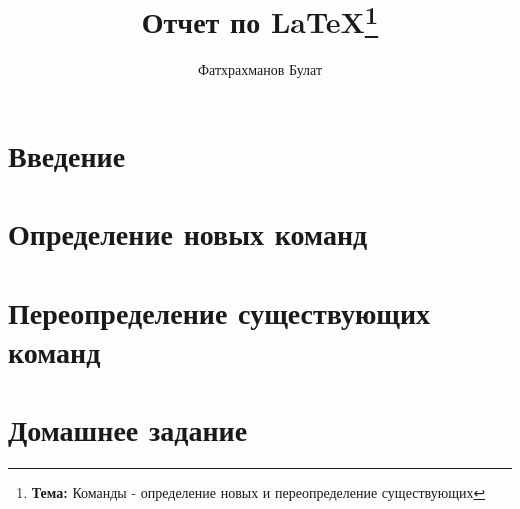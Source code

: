 \documentclass[14pt]{report}
\author{Фатхрахманов Булат}
\title{Отчет по \LaTeX \thanks{{\bf Тема:} Команды - определение новых и переопределение существующих}}
\begin{document}
	\maketitle
	\tableofcontents
	\newpage
	\part{Введение}
	\part{Определение новых команд}
	\part{Переопределение существующих команд}
	\part{Домашнее задание}
\end{document}

